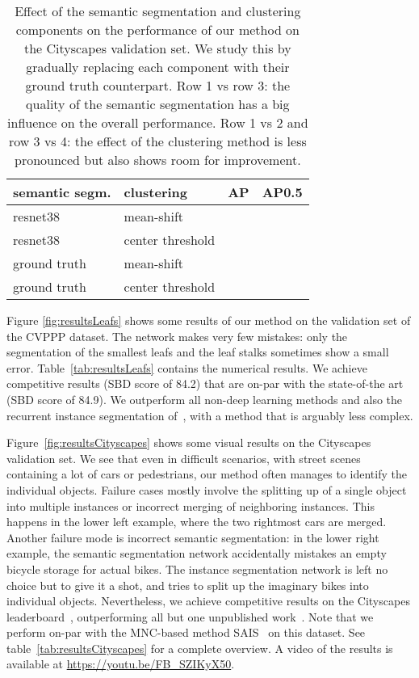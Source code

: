 \documentclass[10pt,twocolumn,letterpaper]{article}
\begin{document}
\begin{table}
	\begin{center}
		\begin{tabular}{l|l||c|c}
			semantic segm. & clustering & AP & AP0.5\\
			\hline
			resnet38~\cite{wu2016wider} & mean-shift &  &  \\
			resnet38~\cite{wu2016wider} & center threshold &  &  \\
ground truth & mean-shift &  &  \\
            ground truth & center threshold &  &  \\
		\end{tabular}
	\end{center}
	\caption{Effect of the semantic segmentation and clustering components on the performance of our method on the Cityscapes validation set. We study this by gradually replacing each component with their ground truth counterpart. Row 1 vs row 3: the quality of the semantic segmentation has a big influence on the overall performance. Row 1 vs 2 and row 3 vs 4: the effect of the clustering method is less pronounced but also shows room for improvement.}
	\label{tab:resultsLeafsIndividualComponents}
\end{table}

Figure \ref{fig:resultsLeafs} shows some results of our method on the validation set of the CVPPP dataset. The network makes very few mistakes: only the segmentation of the smallest leafs and the leaf stalks sometimes show a small error. Table~\ref{tab:resultsLeafs} contains the numerical results. We achieve competitive results (SBD score of 84.2) that are on-par with the state-of-the art (SBD score of 84.9). We outperform all non-deep learning methods and also the recurrent instance segmentation of~\cite{romera2015recurrent}, with a method that is arguably less complex.

Figure~\ref{fig:resultsCityscapes} shows some visual results on the Cityscapes validation set. We see that even in difficult scenarios, with street scenes containing a lot of cars or pedestrians, our method often manages to identify the individual objects. Failure cases mostly involve the splitting up of a single object into multiple instances or incorrect merging of neighboring instances. 
This happens in the lower left example, where the two rightmost cars are merged. 
Another failure mode is incorrect semantic segmentation: in the lower right example, the semantic segmentation network accidentally mistakes an empty bicycle storage for actual bikes. The instance segmentation network is left no choice but to give it a shot, and tries to split up the imaginary bikes into individual objects.
Nevertheless, we achieve competitive results on the Cityscapes leaderboard~\cite{cityscapes}, outperforming all but one unpublished work~\cite{arnab2017pixelwise}. 
Note that we perform on-par with the MNC-based method SAIS~\cite{dai2015instance, hayder2016shape} on this dataset. 
See table~\ref{tab:resultsCityscapes} for a complete overview. A video of the results is available at \url{https://youtu.be/FB_SZIKyX50}.
\end{document}
